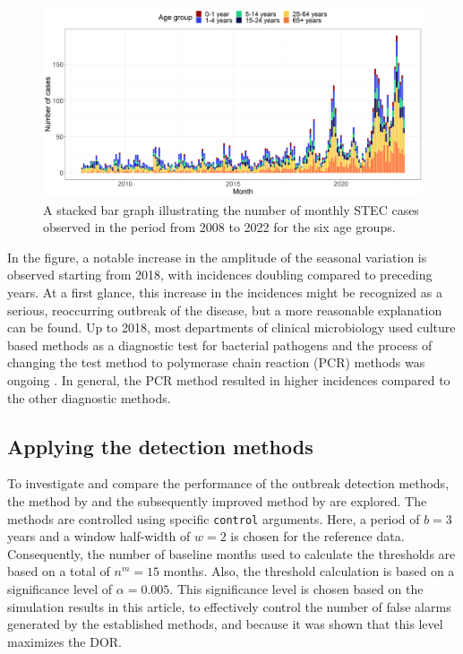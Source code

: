 \documentclass[preprint, 3p, authoryear]{elsarticle} %
\begin{document}
\begin{figure}[H]
\includegraphics[width=1\linewidth]{../../figures/STEC_long_plot} \caption{A stacked bar graph illustrating the number of monthly STEC cases observed in the period from 2008 to 2022 for the six age groups.}\label{fig:STEC}
\end{figure}

In the figure, a notable increase in the amplitude of the seasonal variation is observed starting from 2018, with incidences doubling compared to preceding years. At a first glance, this increase in the incidences might be recognized as a serious, reoccurring outbreak of the disease, but a more reasonable explanation can be found. Up to 2018, most departments of clinical microbiology used culture based methods as a diagnostic test for bacterial pathogens and the process of changing the test method to polymerase chain reaction (PCR) methods was ongoing \citep{Svendsen_2023}. In general, the PCR method resulted in higher incidences compared to the other diagnostic methods.

\hypertarget{applying-the-detection-methods}{%
\subsection{Applying the detection methods}\label{applying-the-detection-methods}}

To investigate and compare the performance of the outbreak detection methods, the method by \citet{Farrington_1996} and the subsequently improved method by \citet{Noufaily_2013} are explored. The methods are controlled using specific \texttt{control} arguments. Here, a period of \(b=3\) years and a window half-width of \(w=2\) is chosen for the reference data. Consequently, the number of baseline months used to calculate the thresholds are based on a total of \(n^{m}=15\) months. Also, the threshold calculation is based on a significance level of \(\alpha=0.005\). This significance level is chosen based on the simulation results in this article, to effectively control the number of false alarms generated by the established methods, and because it was shown that this level maximizes the DOR.
\end{document}
